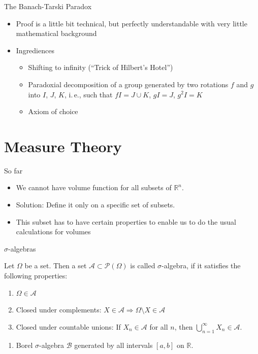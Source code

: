 \documentclass{beamer}
\newcommand{\RR}{\mathbb{R}}
\begin{document}
\begin{frame}{The Banach-Tarski Paradox}
  \begin{itemize}
  \item Proof is a little bit technical, but perfectly understandable
     with very little mathematical background
  \item Ingrediences
    \begin{itemize}
    \item Shifting to infinity (``Trick of Hilbert's Hotel'')
    \item Paradoxial decomposition of a group generated by two rotations $f$ and $g$ into $I$, $J$, $K$, i.\,e., such that $fI = J \cup K$, $gI = J$, $g^2I = K$
    \item Axiom of choice
    \end{itemize}
  \end{itemize}
\end{frame}

\section{Measure Theory}

\begin{frame}{So far}
  \begin{itemize}
  \item We cannot have volume function for all subsets of $\RR^n$.
  \item Solution: Define it only on a specific set of subsets.
  \item This subset has to have certain properties to enable us
    to do the usual calculations for volumes
  \end{itemize}
\end{frame}

\begin{frame}{$\sigma$-algebras}
  \begin{definition}
    Let $\Omega$ be a set. Then a set $\mathcal{A} \subset \mathcal{P}(\Omega)$
    is called $\sigma$-algebra, if it satisfies the following properties:
    \begin{enumerate}
    \item $\Omega \in \mathcal{A}$
    \item Closed under complements: $X \in \mathcal{A} \Rightarrow
      \Omega\setminus X \in \mathcal{A}$
    \item Closed under countable unions: If $X_n \in \mathcal{A}$ for all $n$,
      then $\bigcup_{n=1}^\infty X_n \in \mathcal{A}$.
    \end{enumerate}
  \end{definition}

  \begin{example}
    \begin{enumerate}
    \item Borel $\sigma$-algebra $\mathcal{B}$ generated by all intervals
      $[a,b]$ on $\RR$.
    \end{enumerate}
  \end{example}
\end{frame}
\end{document}
